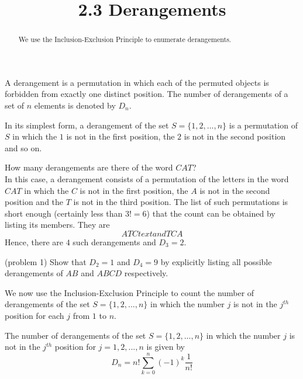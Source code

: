 \documentclass[handout]{ximera}
\title{2.3 Derangements}
\begin{document}
\begin{abstract}
We use the Inclusion-Exclusion Principle to enumerate derangements.
\end{abstract}

\maketitle



\begin{definition}[Derangements]
A derangement is a permutation in which each of the permuted objects is forbidden from exactly one distinct position.
The number of derangements of a set of $n$ elements is denoted by $D_n$.
\end{definition}

\begin{remark}
In its simplest form, a derangement of the set $S = \{1, 2, ..., n\}$ is a permutation of $S$ in 
which the $1$ is not in the first position, the $2$ is not in the second position and so on.
\end{remark}

\begin{example}
How many derangements are there of the word $CAT$?\\
In this case, a derangement consists of a permutation of the letters in the word $CAT$ in 
which the $C$ is not in the first position, the $A$ is not in the second position 
and the $T$ is not in the third position. The list of such permutations is short 
enough (certainly less than $3! = 6$) that the count can be 
obtained by listing its members.  They are
\[
ATC text{and} TCA
\]
Hence, there are $4$ such derangements and $D_3 =2$.  
\end{example}

\begin{problem}(problem 1)
Show that $D_2 = 1$ and $D_4 = 9$ by explicitly listing all possible derangements of $AB$ and $ABCD$ respectively.
\end{problem}

We now use the Inclusion-Exclusion Principle to count the number of derangements of the set $S = \{1, 2, ..., n\}$
in which the number $j$ is not in the $j^{th}$ position for each $j$ from $1$ to $n$.

\begin{proposition}[Derangements]
The number of derangements of the set $S = \{1, 2, ..., n\}$
in which the number $j$ is not in the $j^{th}$ position for $j = 1, 2, ..., n$ is given by
\[
D_n = n!\sum_{k = 0}^n (-1)^k \frac{1}{n!}
\]
\end{proposition}
\end{document}
